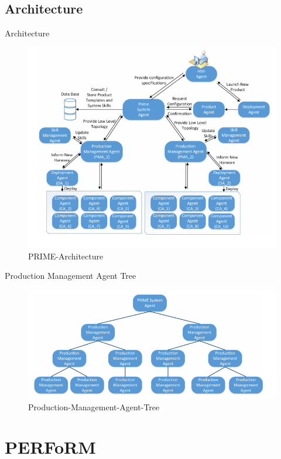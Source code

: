 \documentclass[12pt]{beamer}
\begin{document}
\subsection{Architecture}
\begin{frame}{Architecture}
	\begin{figure}
		\includegraphics[scale=0.435]{PRIME/PRIME-Architecture}
		\caption{PRIME-Architecture \cite{Hybrid}}
	\end{figure}
\end{frame}

\begin{frame}{Production Management Agent Tree}
	\begin{figure}
		\includegraphics[scale=0.385]{PRIME/Production-Management-Agent-Tree}
		\caption{Production-Management-Agent-Tree \cite{Hybrid}}
	\end{figure}
\end{frame}

\section{PERFoRM}
\end{document}
